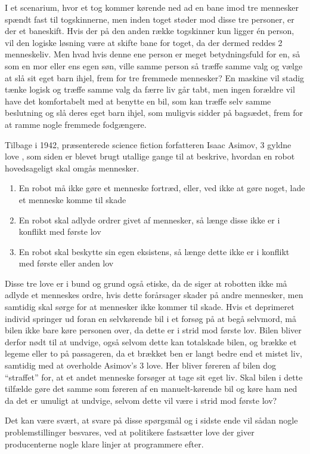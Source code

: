 	I et scenarium, hvor et tog kommer kørende ned ad en bane imod tre mennesker spændt fast til togskinnerne, men inden toget støder mod disse tre personer, er der et baneskift. Hvis der på den anden række togskinner kun ligger \'en person, vil den logiske løsning være at skifte bane for toget, da der dermed reddes 2 menneskeliv. Men hvad hvis denne ene person er meget betydningsfuld for en, så som en mor eller ens egen søn, ville samme person så træffe samme valg og vælge at slå sit eget barn ihjel, frem for tre fremmede mennesker? En maskine vil stadig tænke logisk og træffe samme valg da færre liv går tabt, men ingen forældre vil have det komfortabelt med at benytte en bil, som kan træffe selv samme beslutning og slå deres eget barn ihjel, som muligvis sidder på bagsædet, frem for at ramme nogle fremmede fodgængere.
	
	Tilbage i 1942, præsenterede science fiction forfatteren Isaac Asimov, 3 gyldne love \cite{Asimov}, som siden er blevet brugt utallige gange til at beskrive, hvordan en robot hovedsageligt skal omgås mennesker.
	
	\begin{enumerate}
		
		\item En robot må ikke gøre et menneske fortræd, eller, ved ikke at gøre noget, lade et menneske komme til skade
		\item En robot skal adlyde ordrer givet af mennesker, så længe disse ikke er i konflikt med første lov
		\item En robot skal beskytte sin egen eksistens, så længe dette ikke er i konflikt med første eller anden lov
		
	\end{enumerate}
	
	Disse tre love er i bund og grund også etiske, da de siger at robotten ikke må adlyde et menneskes ordre, hvis dette forårsager skader på andre mennesker, men samtidig skal sørge for at mennesker ikke kommer til skade. Hvis et deprimeret individ springer ud foran en selvkørende bil i et forsøg på at begå selvmord, må bilen ikke bare køre personen over, da dette er i strid mod første lov. Bilen bliver derfor nødt til at undvige, også selvom dette kan totalskade bilen, og brække et legeme eller to på passageren, da et brækket ben er langt bedre end et mistet liv, samtidig med at overholde Asimov's 3 love. Her bliver føreren af bilen dog ``straffet'' for, at et andet menneske forsøger at tage sit eget liv. Skal bilen i dette tilfælde gøre det samme som føreren af en manuelt-kørende bil og køre ham ned da det er umuligt at undvige, selvom dette vil være i strid mod første lov? 

	Det kan være svært, at svare på disse spørgsmål og i sidste ende vil sådan nogle problemstillinger besvares, ved at politikere fastsætter love der giver producenterne nogle klare linjer at programmere efter.